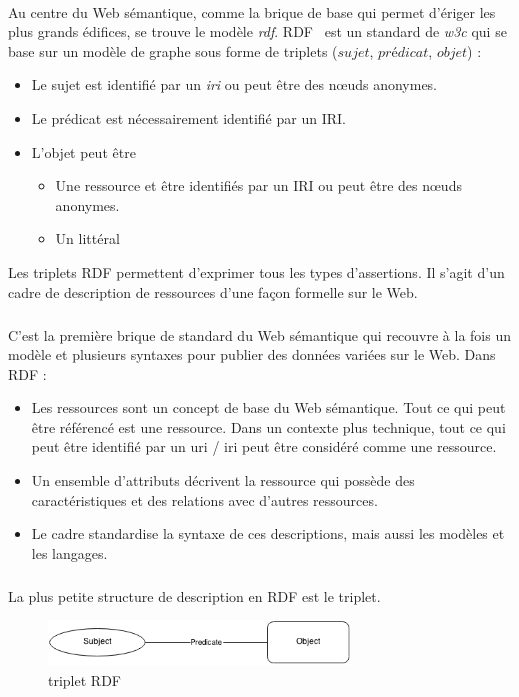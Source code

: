 \paragraph{}
Au centre du Web sémantique, comme la brique de base qui permet d’ériger les plus grands édifices, se trouve le modèle {\itshape\gls{rdf}}. RDF~\cite{RDF_Concepts_W3C:04} est un standard de {\itshape \gls{w3c}} qui se base sur un modèle de graphe sous forme de triplets ($sujet$, $prédicat$, $objet$) : 
\begin{itemize}
\item Le sujet est identifié par un {\itshape \gls{iri}} ou peut être des n\oe{}uds anonymes.
\item Le prédicat est nécessairement identifié par un IRI.
\item L'objet peut être 
\begin{itemize}
\item Une ressource et être identifiés par un IRI ou peut être des n\oe{}uds anonymes.
\item Un littéral
\end{itemize}
\end{itemize}
Les triplets RDF permettent d'exprimer tous les types d'assertions. Il s’agit d’un cadre de description de ressources d’une façon formelle sur le Web. 
\subparagraph{}
C’est la première brique de standard du Web sémantique qui recouvre à la fois un modèle et plusieurs syntaxes pour publier des données variées sur le Web.
\newline
Dans RDF :
\newline
\begin{itemize}
\item Les ressources sont un concept de base du Web sémantique. Tout ce qui peut être référencé est une ressource. Dans un contexte plus technique, tout ce qui peut être identifié par un \gls{uri} / \gls{iri} peut être considéré comme une ressource.
\item Un ensemble d’attributs décrivent la ressource qui possède des caractéristiques et des relations avec d’autres ressources.
\item Le cadre standardise la syntaxe de ces descriptions, mais aussi les modèles et les langages.
\end{itemize}
\subparagraph{}
La plus petite structure de description en RDF est le triplet.
\begin{figure}[H]
\centering
\includegraphics[width=8cm]{tripletrdf.png}
\caption{triplet RDF}
\end{figure}
